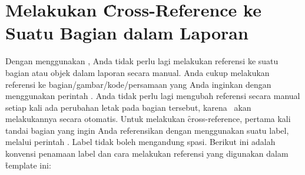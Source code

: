 \section{Melakukan \f{Cross-Reference} ke Suatu Bagian dalam Laporan}
\label{sec:crossReference}
Dengan menggunakan \latex, Anda tidak perlu lagi melakukan referensi ke suatu bagian atau objek dalam laporan secara manual. Anda cukup melakukan referensi ke bagian/gambar/kode/persamaan yang Anda inginkan dengan menggunakan perintah . Anda tidak perlu lagi mengubah referensi secara manual setiap kali ada perubahan letak pada bagian tersebut, karena \latex~akan melakukannya secara otomatis. Untuk melakukan \f{cross-reference}, pertama kali tandai bagian yang ingin Anda referensikan dengan menggunakan suatu label, melalui perintah . Label tidak boleh mengandung spasi. Berikut ini adalah konvensi penamaan label dan cara melakukan referensi yang digunakan dalam \f{template} ini:
